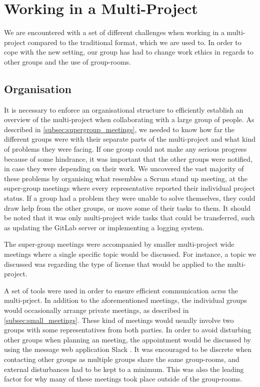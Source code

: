 \section{Working in a Multi-Project}
We are encountered with a set of different challenges when working in a multi-project compared to the traditional format, which we are used to. In order to cope with the new setting, our group has had to change work ethics in regards to other groups and the use of group-rooms.

\subsection{Organisation}
It is necessary to enforce an organisational structure to efficiently establish an overview of the multi-project when collaborating with a large group of people. As described in \cref{subsec:supergroup_meetings}, we needed to know how far the different groups were with their separate parts of the multi-project and what kind of problems they were facing. If one group could not make any serious progress because of some hindrance, it was important that the other groups were notified, in case they were depending on their work. We uncovered the vast majority of these problems by organising what resembles a Scrum stand up meeting, at the super-group meetings where every representative reported their individual project status. If a group had a problem they were unable to solve themselves, they could draw help from the other groups, or move some of their tasks to them. It should be noted that it was only multi-project wide tasks that could be transferred, such as updating the GitLab server or implementing a logging system.

The super-group meetings were accompanied by smaller multi-project wide meetings where a single specific topic would be discussed. For instance, a topic we discussed was regarding the type of license that would be applied to the multi-project.

A set of tools were used in order to ensure efficient communication acrss the multi-prject. In addition to the aforementioned meetings, the individual groups would occasionally arrange private meetings, as described in \cref{subsec:small_meetings}. These kind of meetings would usually involve two groups with some representatives from both parties. In order to avoid disturbing other groups when planning an meeting, the appointment would be discussed by using the message web application Slack \cite{slack}. It was encouraged to be discrete when contacting other groups as multiple groups share the same group-rooms, and external disturbances had to be kept to a minimum. This was also the leading factor for why many of these meetings took place outside of the group-rooms.

